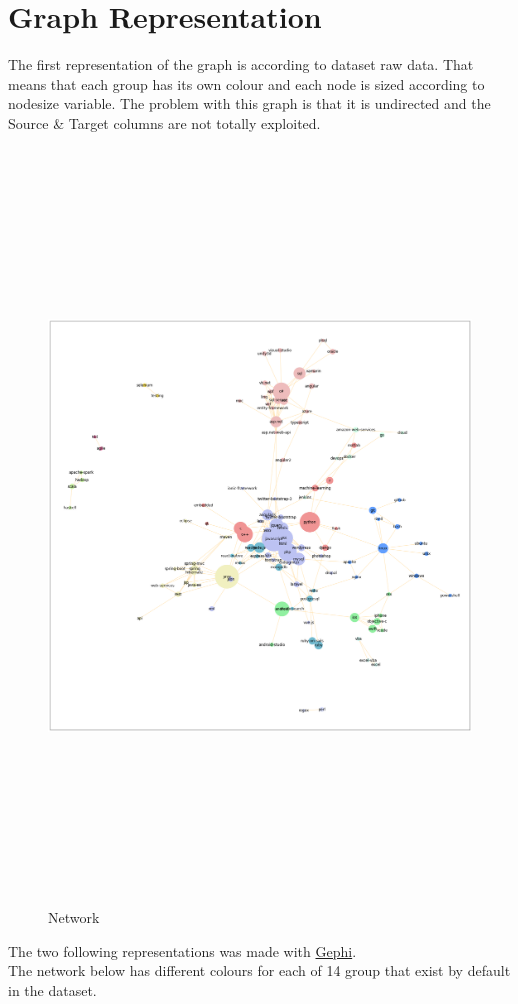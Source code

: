 \documentclass[12pt]{article}
\begin{document}
	\section{Graph Representation}
		The first representation of the graph is according to dataset raw data. That means that each group has its own colour and each node is sized according to nodesize variable. The problem with this graph is that it is undirected and the Source \& Target columns are not totally exploited.  
			\begin{figure}[ht]
					\includegraphics[width=17cm,height=20cm]{index}
					\caption{Network}
			\end{figure}
		\FloatBarrier
		The two following representations was made with \href{https://gephi.org/}{Gephi}.\\
		The network below has different colours for each of 14 group that exist by default in the dataset. 
\end{document}
